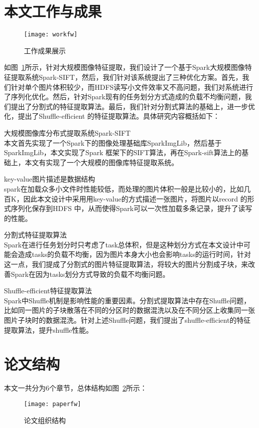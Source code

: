\section{本文工作与成果}
\begin{figure}[htp]
\centering
\texttt{[image: workfw]}
\caption{工作成果展示}
\label{fig:workfw}
\end{figure}
如图~\ref{fig:workfw}所示，针对大规模图像特征提取，我们设计了一个基于Spark大规模图像特征提取系统Spark-SIFT，然后，我们针对该系统提出了三种优化方案。首先，我们针对单个图片体积较少，而HDFS读写小文件效率又不高问题，我们对系统进行了序列化优化。然后，针对Spark现有的任务划分方式造成的负载不均衡问题，我们提出了分割式的特征提取算法。最后，我们针对分割式算法的基础上，进一步优化，提出了Shuffle-efficient 的特征提取算法。具体研究内容概括如下：
\begin{compactenum}
\item 大规模图像库分布式提取系统Spark-SIFT\\本文首先实现了一个Spark下的图像处理基础库SparkImgLib，然后基于SparkImgLib，本文实现了Spark 框架下的SIFT算法，再在Spark-sift算法上的基础上，本文有实现了一个大规模的图像库特征提取系统。
\item key-value图片描述是数据结构\\spark在加载众多小文件时性能较低，而处理的图片体积一般是比较小的，比如几百K，因此本文设计中采用用key-value的方式描述一张图片，将图片以record 的形式序列化保存到HDFS 中，从而使得Spark可以一次性加载多条记录，提升了读写的性能。
\item 分割式特征提取算法\\Spark在进行任务划分时只考虑了task总体积，但是这种划分方式在本文设计中可能会造成tasks的负载不均衡，因为图片本身大小也会影响tasks的运行时间，针对这一点，我们提成了分割式的图片特征提取算法，将较大的图片分割成子块，来改善Spark在因为tasks划分方式导致的负载不均衡问题。
\item Shuffle-efficient特征提取算法\\Spark中Shuffle机制是影响性能的重要因素。分割式提取算法中存在Shuffle问题，比如同一图片的子块散落在不同的分区时的数据混洗以及在不同分区上收集同一张图片子块时的数据混洗。针对上述Shuffle问题，我们提出了shuffle-efficient的特征提取算法，提升shuffle性能。
\end{compactenum}

\section{论文结构}
本文一共分为6个章节，总体结构如图~\ref{fig:paperfw}所示：
\begin{figure}[htp]
\centering
\texttt{[image: paperfw]}
\caption{论文组织结构}
\label{fig:paperfw}
\end{figure}

